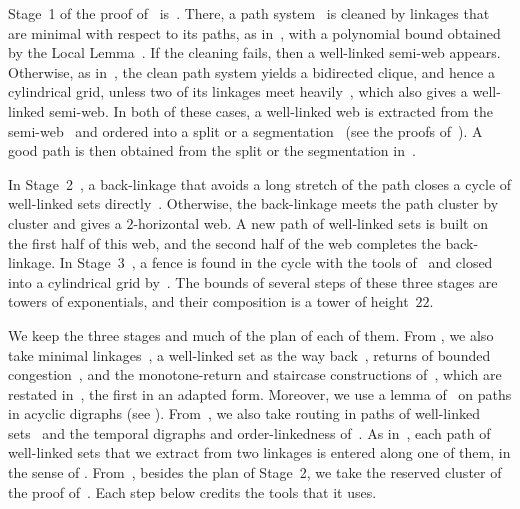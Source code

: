 \documentclass[fontsize=12pt,leading=14pt]{fullpaper}
\newcounter{step}
\begin{document}
Stage~1 of the proof of~\cite{HKMM26a,HKMM26b} is~\cite[Theorem~9.9]{HKMM26a}.
There, a path system~\cite[Definition~4.5]{KawarabayashiK15} is cleaned by linkages that are minimal with respect to its paths, as in~\cite[Lemma~4.7]{KawarabayashiK15}, with a polynomial bound obtained by the Local Lemma~\cite[Lemma~5.11]{HKMM26a}.
If the cleaning fails, then a well-linked semi-web appears.
Otherwise, as in~\cite[Lemma~4.8]{KawarabayashiK15}, the clean path system yields a bidirected clique, and hence a cylindrical grid, unless two of its linkages meet heavily~\cite[Lemma~5.13]{HKMM26a}, which also gives a well-linked semi-web.
In both of these cases, a well-linked web is extracted from the semi-web~\cite[Lemma~5.10]{HKMM26a} and ordered into a split or a segmentation~\cite[Lemma~5.2]{HKMM26a} (see the proofs of~\cite[Lemma~5.13 and Theorem~5.14]{HKMM26a}).
A good path is then obtained from the split or the segmentation in~\cite[Section~9]{HKMM26a}.

In Stage~2~\cite[sections~4 and~5]{HKMM26b}, a back-linkage that avoids a long stretch of the path closes a cycle of well-linked sets directly~\cite[Lemma~4.2]{HKMM26b}.
Otherwise, the back-linkage meets the path cluster by cluster and gives a $2$-horizontal web.
A new path of well-linked sets is built on the first half of this web, and the second half of the web completes the back-linkage.
In Stage~3~\cite[Theorem~3.18]{HKMM26b}, a fence is found in the cycle with the tools of~\cite[sections~6--8]{HKMM26a} and closed into a cylindrical grid by~\cite[Lemma~6.3]{KawarabayashiK15}.
The bounds of several steps of these three stages are towers of exponentials, and their composition is a tower of height~$22$.

We keep the three stages and much of the plan of each of them.
From \textcite{KawarabayashiK15}, we also take minimal linkages~\cite[Definition~2.13]{KawarabayashiK15}, a well-linked set as the way back~\cite[Theorem~4.2 and Lemma~5.21]{KawarabayashiK15}, returns of bounded congestion~\cite[Lemma~5.24]{KawarabayashiK15}, and the monotone-return and staircase constructions of~\cite[(3.3) and~(4.7)]{ReedRST96}, which are restated in~\cite[lemmas~6.3 and~5.5]{KawarabayashiK15}, the first in an adapted form.
Moreover, we use a lemma of~\cite[(4.6)]{ReedRST96} on paths in acyclic digraphs (see ).
From~\cite{HKMM26a}, we also take routing in paths of well-linked sets~\cite[Lemma~8.8]{HKMM26a} and the temporal digraphs and order-linkedness of~\cite[sections~6 and~7]{HKMM26a}.
As in~\cite[lemmas~9.2 and~9.7]{HKMM26a}, each path of well-linked sets that we extract from two linkages is entered along one of them, in the sense of .
From~\cite{HKMM26b}, besides the plan of Stage~2, we take the reserved cluster of the proof of~\cite[Theorem~3.18]{HKMM26b}.
Each step below credits the tools that it uses.
\end{document}
